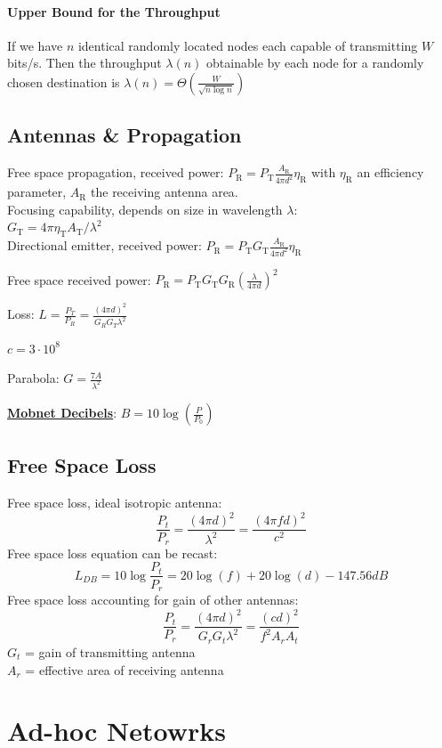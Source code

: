 \documentclass[10pt, a4paper,twocolumn]{scrartcl}
\begin{document}
\paragraph{Upper Bound for the Throughput} 
If we have $n$ identical randomly located nodes each capable of transmitting $W$ bits/s. 
Then the throughput $\lambda(n)$ obtainable by each node for a randomly chosen destination is $\lambda(n) = \Theta\left(\frac W{\sqrt{n\log n}}\right)$

\subsection{Antennas \& Propagation}
Free space propagation, received power: $P_\textrm{R} = P_\textrm{T}\frac{A_\textrm{R}}{4\pi d^2}\eta_\textrm{R}$ with $\eta_\textrm{R}$ an efficiency parameter, $A_\textrm{R}$ the receiving antenna area.
\\
Focusing capability, depends on size in wavelength $\lambda$:  
\\$G_\textrm{T} = 4\pi\eta_\textrm{T}A_\textrm{T}/\lambda^2$ \\
Directional emitter, received power: $P_\textrm{R} = P_\textrm{T}G_\textrm{T}\frac{A_\textrm{R}}{4\pi d^2}\eta_\textrm{R}$

Free space received power: $P_\textrm{R} =  P_\textrm{T}G_\textrm{T}G_\textrm{R}(\frac{\lambda}{4\pi d})^2$

Loss: $L = \frac{P_T}{P_R} = \frac{(4\pi d)^2}{G_RG_T\lambda^2} $

$ c = 3 \cdot 10^8 $

Parabola: $G = \frac{7A}{\lambda^2}$

\underline{\textbf{Mobnet Decibels}}:
$B = 10\log(\frac{P}{P_0})$
\subsection{Free Space Loss}
Free space loss, ideal isotropic antenna:
$$ \frac{P_t}{P_r} = \frac{(4\pi d)^2}{\lambda^2} = \frac{(4\pi fd)^2}{c^2} $$
Free space loss equation can be recast:
$$L_{DB} = 10\log \frac{P_t}{P_r} = 20 \log(f) +20\log(d) - 147.56 dB$$
Free space loss accounting for gain of other antennas: 
$$\frac{P_t}{P_r} = \frac{(4\pi d)^2}{G_rG_t\lambda^2} = \frac{(cd)^2}{f^2A_rA_t}$$
$G_t$ = gain of transmitting antenna\\
$A_r$ = effective area of receiving antenna

\section{Ad-hoc Netowrks} %
\end{document}
